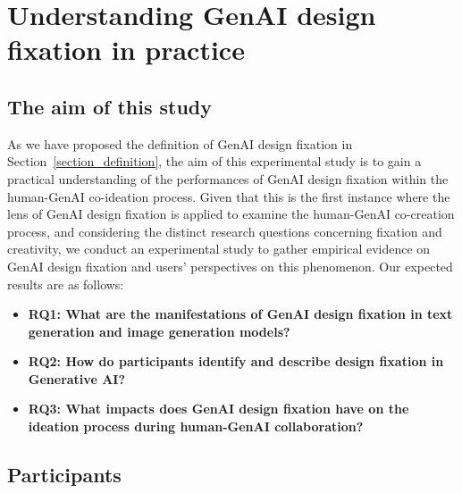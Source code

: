 \section{Understanding GenAI design fixation in practice}
\label{section_experiment}
\subsection{The aim of this study}
As we have proposed the definition of GenAI design fixation in Section~\ref{section_definition}, the aim of this experimental study is to gain a practical understanding of the performances of GenAI design fixation within the human-GenAI co-ideation process. Given that this is the first instance where the lens of GenAI design fixation is applied to examine the human-GenAI co-creation process, and considering the distinct research questions concerning fixation and creativity, we conduct an experimental study to gather empirical evidence on GenAI design fixation and users' perspectives on this phenomenon. Our expected results are as follows:
\begin{itemize}
    \item \textbf{RQ1: What are the manifestations of GenAI design fixation in text generation and image generation models?}
    \item \textbf{RQ2: How do participants identify and describe design fixation in Generative AI?}
    \item \textbf{RQ3: What impacts does GenAI design fixation have on the ideation process during human-GenAI collaboration?}
\end{itemize}



\subsection{Participants}

